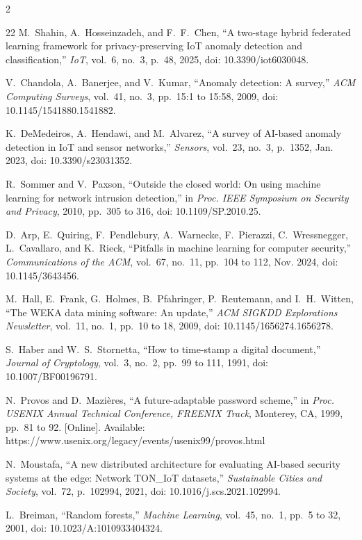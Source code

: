\documentclass[journal,onecolumn]{IEEEtran}
\begin{document}
\begin{multicols}{2}
\begin{thebibliography}{22}
M.~Shahin, A.~Hosseinzadeh, and F.~F.~Chen, ``A two-stage hybrid federated learning framework for privacy-preserving IoT anomaly detection and classification,'' \emph{IoT}, vol.~6, no.~3, p.~48, 2025, doi: 10.3390/iot6030048.

V.~Chandola, A.~Banerjee, and V.~Kumar, ``Anomaly detection: A survey,'' \emph{ACM Computing Surveys}, vol.~41, no.~3, pp.~15:1 to 15:58, 2009, doi: 10.1145/1541880.1541882.

K.~DeMedeiros, A.~Hendawi, and M.~Alvarez, ``A survey of AI-based anomaly detection in IoT and sensor networks,'' \emph{Sensors}, vol.~23, no.~3, p.~1352, Jan. 2023, doi: 10.3390/s23031352.

R.~Sommer and V.~Paxson, ``Outside the closed world: On using machine learning for network intrusion detection,'' in \emph{Proc. IEEE Symposium on Security and Privacy}, 2010, pp.~305 to 316, doi: 10.1109/SP.2010.25.

D.~Arp, E.~Quiring, F.~Pendlebury, A.~Warnecke, F.~Pierazzi, C.~Wressnegger, L.~Cavallaro, and K.~Rieck, ``Pitfalls in machine learning for computer security,'' \emph{Communications of the ACM}, vol.~67, no.~11, pp.~104 to 112, Nov. 2024, doi: 10.1145/3643456.

M.~Hall, E.~Frank, G.~Holmes, B.~Pfahringer, P.~Reutemann, and I.~H.~Witten, ``The WEKA data mining software: An update,'' \emph{ACM SIGKDD Explorations Newsletter}, vol.~11, no.~1, pp.~10 to 18, 2009, doi: 10.1145/1656274.1656278.

S.~Haber and W.~S.~Stornetta, ``How to time-stamp a digital document,'' \emph{Journal of Cryptology}, vol.~3, no.~2, pp.~99 to 111, 1991, doi: 10.1007/BF00196791.

N.~Provos and D.~Mazi{\`e}res, ``A future-adaptable password scheme,'' in \emph{Proc. USENIX Annual Technical Conference, FREENIX Track}, Monterey, CA, 1999, pp.~81 to 92. [Online]. Available: https://www.usenix.org/legacy/events/usenix99/provos.html

N.~Moustafa, ``A new distributed architecture for evaluating AI-based security systems at the edge: Network TON\_IoT datasets,'' \emph{Sustainable Cities and Society}, vol.~72, p.~102994, 2021, doi: 10.1016/j.scs.2021.102994.

L.~Breiman, ``Random forests,'' \emph{Machine Learning}, vol.~45, no.~1, pp.~5 to 32, 2001, doi: 10.1023/A:1010933404324.


\end{thebibliography}
\end{multicols}
\end{document}
